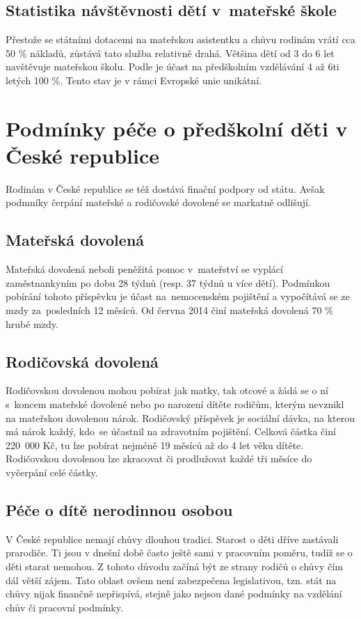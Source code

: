 			\subsection{Statistika návštěvnosti dětí v mateřské škole}
			\label{statistika}
				Přestože se státními dotacemi na mateřskou asistentku a chůvu rodinám vrátí cca 50 \% nákladů, zůstává tato služba relativně drahá. Většina dětí od 3 do 6 let navštěvuje mateřskou školu. Podle \cite{Eurydice} je účast na předškolním vzdělávání 4 až 6ti letých 100 \%. Tento stav je v rámci Evropské unie unikátní. 
			

		\section{Podmínky péče o předškolní děti v České republice}
		Rodinám v České republice se též dostává finační podpory od státu. Avšak podmníky čerpání mateřské a rodičovské dovolené se markatně odlišují.

			\subsection{Mateřská dovolená}
				Mateřská dovolená neboli peněžitá pomoc v mateřství se vyplácí zaměstnankyním po dobu 28 týdnů (resp. 37 týdnů u více dětí). Podmínkou pobírání tohoto příspěvku je účast na nemocenském pojištění a vypočítává se ze mzdy za posledních 12 měsíců. Od června 2014 činí mateřská dovolená 70 \% hrubé mzdy. \citep{materska}

			\subsection{Rodičovská dovolená}
				Rodičovskou dovolenou mohou pobírat jak matky, tak otcové a žádá se o ní s koncem mateřské dovolené nebo po narození dítěte rodičům, kterým nevznikl na mateřskou dovolenou nárok. Rodičovský příspěvek je sociální dávka, na kterou má nárok každý, kdo se účastnil na zdravotním pojištění. Celková částka činí 220 000 Kč, tu lze pobírat nejméně 19 měsíců až do 4 let věku dítěte. Rodičovskou dovolenou lze zkracovat či prodlužovat každé tři měsíce do vyčerpání celé částky. \citep{rodicovska}

			\subsection{Péče o dítě nerodinnou osobou}
				V České republice nemají chůvy dlouhou tradici. Starost o děti dříve zastávali prarodiče. Ti jsou v dnešní době často ještě sami v pracovním poměru, tudíž se o děti starat nemohou. Z tohoto důvodu začíná být ze strany rodičů o chůvy čím dál větší zájem. Tato oblast ovšem není zabezpečena legislativou, tzn. stát na chůvy nijak finančně nepřispívá, stejně jako nejsou dané podmínky na vzdělání chův či pracovní podmínky. 


